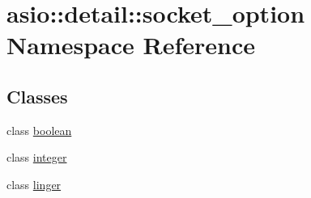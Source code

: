 \hypertarget{namespaceasio_1_1detail_1_1socket__option}{}\section{asio\+:\+:detail\+:\+:socket\+\_\+option Namespace Reference}
\label{namespaceasio_1_1detail_1_1socket__option}
\subsection*{Classes}
\begin{DoxyCompactItemize}
\item 
class \hyperlink{classasio_1_1detail_1_1socket__option_1_1boolean}{boolean}
\item 
class \hyperlink{classasio_1_1detail_1_1socket__option_1_1integer}{integer}
\item 
class \hyperlink{classasio_1_1detail_1_1socket__option_1_1linger}{linger}
\end{DoxyCompactItemize}
